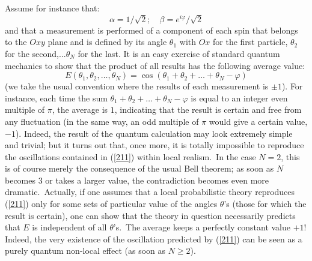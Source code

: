 \documentclass[12pt,onecolumn]{article}%
\begin{document}
Assume for instance that:%
\begin{equation}
\alpha=1/\sqrt{2} ; \quad \beta=e^{i\varphi
}/\sqrt{2} \label{21bis}%
\end{equation}
and that a measurement is performed of a component of each spin that belongs
to the $Oxy$ plane and is defined by its angle $\theta_{1}$ with $Ox$ for the
first particle, $\theta_{2}$ for the second,...$\theta_{N}$ for the last. It
is an easy exercise of standard quantum mechanics to show that the product of
all results has the following average value:
\begin{equation}
E(\theta_{1},\theta_{2},\ldots, \theta_{N})=\cos(\theta_{1}+\theta_{2}%
+\ldots + \theta_{N}-\varphi) \label{211}%
\end{equation}
(we take the usual convention where the results of each measurement is $\pm
1$). For instance, each time the sum $\theta_{1}+\theta_{2}+\ldots + \theta
_{N}-\varphi$ is equal to an integer even multiple of $\pi$, the average is
$1$, indicating that the result is certain and free from any fluctuation (in
the same way, an odd multiple of $\pi$ would give a certain value, $-1$).
Indeed, the result of the quantum calculation may look extremely simple and
trivial; but it turns out that, once more, it is totally impossible to
reproduce the oscillations contained in (\ref{211}) within local realism.\ In
the case $N=2$, this is of course merely the consequence of the usual Bell
theorem; as soon as $N$ becomes $3$ or takes a larger value, the contradiction
becomes even more dramatic.\ Actually, if one assumes that a local
probabilistic theory reproduces (\ref{211}) only for some sets of particular
value of the angles $\theta$'s (those for which the result is certain), one
can show \cite{FL2} that the theory in question necessarily predicts that $E$
is independent of all $\theta$'s.\ The average keeps a perfectly constant
value $+1$! Indeed, the very existence of the oscillation predicted by
(\ref{211}) can be seen as a purely quantum non-local effect (as soon as
$N\geq2$).
\end{document}
